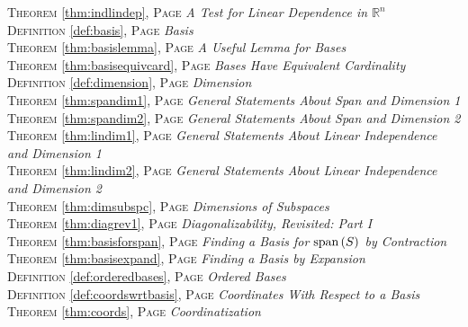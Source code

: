 \begin{multicols}{2}
{\textsc{Theorem} \ref{thm:indlindep}, \textsc{Page} \pageref{thm:indlindep} \textit{A Test for Linear Dependence in \(\mathbb {R}^n\)} \\
\textsc{Definition} \ref{def:basis}, \textsc{Page} \pageref{def:basis} \textit{Basis} \\
\textsc{Theorem} \ref{thm:basislemma}, \textsc{Page} \pageref{thm:basislemma} \textit{A Useful Lemma for Bases} \\
\textsc{Theorem} \ref{thm:basisequivcard}, \textsc{Page} \pageref{thm:basisequivcard} \textit{Bases Have Equivalent Cardinality} \\
\textsc{Definition} \ref{def:dimension}, \textsc{Page} \pageref{def:dimension} \textit{Dimension} \\
\textsc{Theorem} \ref{thm:spandim1}, \textsc{Page} \pageref{thm:spandim1} \textit{General Statements About Span and Dimension 1} \\
\textsc{Theorem} \ref{thm:spandim2}, \textsc{Page} \pageref{thm:spandim2} \textit{General Statements About Span and Dimension 2} \\
\textsc{Theorem} \ref{thm:lindim1}, \textsc{Page} \pageref{thm:lindim1} \textit{General Statements About Linear Independence and Dimension 1} \\
\textsc{Theorem} \ref{thm:lindim2}, \textsc{Page} \pageref{thm:lindim2} \textit{General Statements About Linear Independence and Dimension 2} \\
\textsc{Theorem} \ref{thm:dimsubspc}, \textsc{Page} \pageref{thm:dimsubspc} \textit{Dimensions of Subspaces} \\
\textsc{Theorem} \ref{thm:diagrev1}, \textsc{Page} \pageref{thm:diagrev1} \textit{Diagonalizability, Revisited: Part I} \\
\textsc{Theorem} \ref{thm:basisforspan}, \textsc{Page} \pageref{thm:basisforspan} \textit{Finding a Basis for \(\text{span\,} (S)\) by Contraction} \\
\textsc{Theorem} \ref{thm:basisexpand}, \textsc{Page} \pageref{thm:basisexpand} \textit{Finding a Basis by Expansion} \\
\textsc{Definition} \ref{def:orderedbases}, \textsc{Page} \pageref{def:orderedbases} \textit{Ordered Bases} \\
\textsc{Definition} \ref{def:coordswrtbasis}, \textsc{Page} \pageref{def:coordswrtbasis} \textit{Coordinates With Respect to a Basis} \\
\textsc{Theorem} \ref{thm:coords}, \textsc{Page} \pageref{thm:coords} \textit{Coordinatization} \\
}
\end{multicols}
